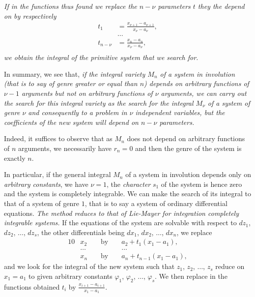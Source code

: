 \documentclass[leqno,11pt]{book}
\makeatletter
\theoremstyle{shape1}
\theoremstyle{shapesmall}
\let\old@phi\phi
\let\old@varphi\varphi
\let\phi\old@varphi
\let\varphi\old@phi
\newcommand{\somespace}{\vspace{9pt}}
\makeatother
\begin{document}
\emph{If in the functions thus found we replace the $n-\nu$ parameters $t$ they the depend on by respectively}
\begin{align*}
  t_{1}&=\frac{x_{\nu+1}-a_{\nu+1}}{x_{\nu}-a_{\nu}},\\
  &\dots\\
  t_{n-\nu}&=\frac{x_{n}-a_{n}}{x_{\nu}-a_{\nu}},\\
\end{align*}
\emph{we obtain the integral of the primitive system that we search for.}

\somespace

In summary, we see that, \emph{if the integral variety $M_{n}$ of a system in involution (that is to say of genre greater or equal than $n$) depends on arbitrary functions of $\nu-1$ arguments but not on arbitrary functions of $\nu$ arguments, we can carry out the search for this integral variety as the search for the integral $M_{\nu}$ of a system of genre $\nu$ and consequently to a problem in $\nu$ independent variables, but the coefficients of the new system will depend on $n-\nu$ parameters.}

Indeed, it suffices to observe that as $M_{n}$ does not depend on arbitrary functions of $n$ arguments, we necessarily have $r_{n}=0$ and then the genre of the system is exactly $n$.

In particular, if the general integral $M_{n}$ of a system in involution depends only on \emph{arbitrary constants}, we have $\nu=1$, the \emph{character} $s_{1}$ of the system is hence zero and the system is completely integrable. We can make the search of its integral to that of a system of genre $1$, that is to say a system of ordinary differential equations. \emph{The method reduces to that of Lie-Mayer for integration completely integrable systems.} If the equations of the system are solvable with respect to $dz_{1}$, $dz_{2}$, $\dots$, $dz_{s}$, the other differentials being $dx_{1}$, $dx_{2}$, $\dots$, $dx_{n}$, we replace
\begin{alignat*}{10}
  &x_{2}&&\text{ by }&&a_{2}+t_{1}(x_{1}-a_{1}),\\
  &\dots&&&&\dots\\
  &x_{n}&&\text{ by }&&a_{n}+t_{n-1}(x_{1}-a_{1}),  
\end{alignat*}
and we look for the integral of the new system such that $z_{1}$, $z_{2}$, $\dots$, $z_{s}$ reduce on $x_{1}=a_{1}$ to given arbitrary constants $\phi_{1}$, $\phi_{2}$, $\dots$, $\phi_{s}$. We then replace in the functions obtained $t_{i}$ by $\frac{x_{i+1}-a_{i+1}}{x_{1}-a_{1}}$.
\end{document}
